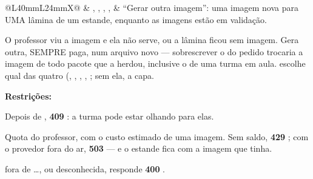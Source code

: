 \begin{tabularx}{\linewidth}{@{}L{40mm}L{24mm}X@{}}
\zebra {} & , , , ,  & \enquote{Gerar outra imagem}: uma imagem nova para UMA lâmina de um estande, enquanto as imagens estão em validação.\par O professor viu a imagem e ela não serve, ou a lâmina ficou sem imagem. Gera outra, SEMPRE paga, num arquivo novo --- sobrescrever o do pedido trocaria a imagem de todo pacote que a herdou, inclusive o de uma turma em aula.  escolhe qual das quatro (, , , , ; sem ela, a capa.\par \textbf{Restrições:}\par \hspace*{1em}\textbullet{} Depois de , \textbf{409} : a turma pode estar olhando para elas.\par \hspace*{1em}\textbullet{} Quota do professor, com o custo estimado de uma imagem. Sem saldo, \textbf{429} ; com o provedor fora do ar, \textbf{503}  --- e o estande fica com a imagem que tinha.\par \hspace*{1em}\textbullet{}  fora de \ldots{}, ou  desconhecida, responde \textbf{400} .\\

\end{tabularx}
